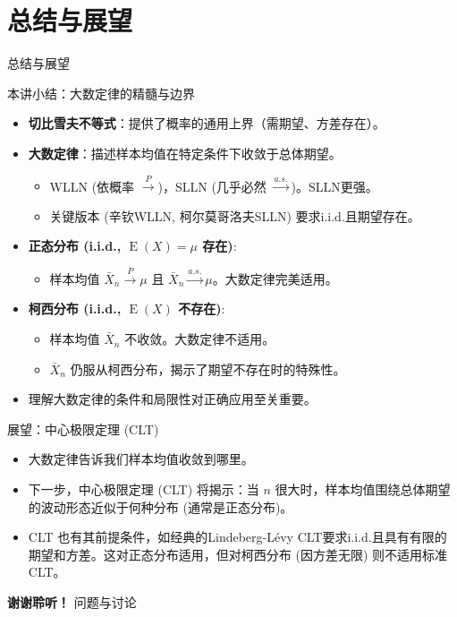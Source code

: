 \documentclass[UTF8]{beamer}
\DeclareMathOperator{\E}{\operatorname{E}}
\begin{document}
\section{总结与展望}
\begin{frame}[shrink=10]{总结与展望}
    \begin{block}{本讲小结：大数定律的精髓与边界}
        \begin{itemize}
            \item \textbf{切比雪夫不等式}：提供了概率的通用上界（需期望、方差存在）。
            \item \textbf{大数定律}：描述样本均值在特定条件下收敛于总体期望。
                \begin{itemize}
                    \item WLLN (依概率 $\xrightarrow{P}$)，SLLN (几乎必然 $\xrightarrow{a.s.}$)。SLLN更强。
                    \item 关键版本 (辛钦WLLN, 柯尔莫哥洛夫SLLN) 要求i.i.d.且\alert{期望存在}。
                \end{itemize}
            \item \textbf{正态分布 (i.i.d., $\E(X)=\mu$ 存在)}:
                \begin{itemize}
                    \item 样本均值 $\bar{X}_n \xrightarrow{P} \mu$ 且 $\bar{X}_n \xrightarrow{a.s.} \mu$。大数定律完美适用。
                \end{itemize}
            \item \textbf{柯西分布 (i.i.d., $\E(X)$ \alert{不存在})}:
                \begin{itemize}
                    \item 样本均值 $\bar{X}_n$ \alert{不收敛}。大数定律\alert{不适用}。
                    \item $\bar{X}_n$ 仍服从柯西分布，揭示了期望不存在时的特殊性。
                \end{itemize}
            \item 理解大数定律的\alert{条件和局限性}对正确应用至关重要。
        \end{itemize}
    \end{block}
    \pause
    \begin{alertblock}{展望：中心极限定理 (CLT)}
        \begin{itemize}
            \item 大数定律告诉我们样本均值\alert{收敛到哪里}。
            \item 下一步，\alert{中心极限定理 (CLT)} 将揭示：当 $n$ 很大时，样本均值围绕总体期望的\alert{波动形态}近似于何种分布 (通常是正态分布)。
            \item CLT 也有其前提条件，如经典的Lindeberg-Lévy CLT要求i.i.d.且具有\alert{有限的期望和方差}。这对正态分布适用，但对柯西分布 (因方差无限) 则不适用标准CLT。
        \end{itemize}
    \end{alertblock}
\end{frame}

\begin{frame}
    \centering
    \Huge{\bfseries 谢谢聆听！}
    \vspace{1cm}
    \normalsize
    问题与讨论
\end{frame}
\end{document}
